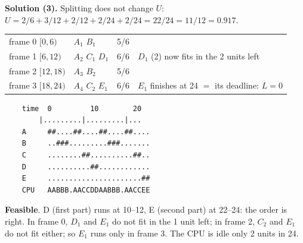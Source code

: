 \textbf{Solution (3).} Splitting does not change $U$: $U = 2/6 + 3/12 + 2/12 + 2/24 + 2/24 = 22/24 = 11/12 = 0.917$.
\begin{center}
    \begin{tabular}{l l l l}
        \hline
        frame 0 $[0,6)$ & $A_1$ $B_1$ & 5/6 & \\
        frame 1 $[6,12)$ & $A_2$ $C_1$ $D_1$ & 6/6 & $D_1$ (2) now fits in the 2 units left \\
        frame 2 $[12,18)$ & $A_3$ $B_2$ & 5/6 & \\
        frame 3 $[18,24)$ & $A_4$ $C_2$ $E_1$ & 6/6 & $E_1$ finishes at 24 $=$ its deadline: $L = 0$ \\
        \hline
    \end{tabular}
\end{center}
\begin{verbatim}
    time  0         10        20
        |.........|.........|...
    A     ##....##....##....##....
    B     ..###.........###.......
    C     ........##..........##..
    D     ..........##............
    E     ......................##
    CPU   AABBB.AACCDDAABBB.AACCEE
\end{verbatim}
\textbf{Feasible}. D (first part) runs at 10--12, E (second part) at 22--24: the order is right. In frame 0, $D_1$ and $E_1$ do not fit in the 1 unit left; in frame 2, $C_2$ and $E_1$ do not fit either; so $E_1$ runs only in frame 3. The CPU is idle only 2 units in 24.

